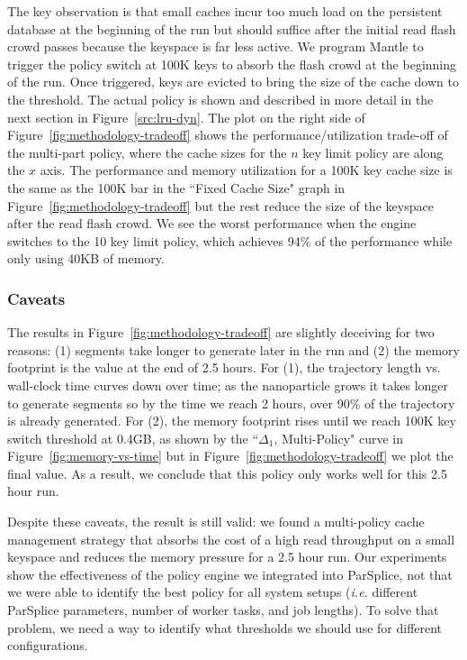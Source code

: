 The key observation is that small caches incur too much load on the persistent
database at the beginning of the run but should suffice after the initial read
flash crowd passes because the keyspace is far less active.  We program Mantle
to trigger the policy switch at 100K keys to absorb the flash crowd at the
beginning of the run. Once triggered, keys are evicted to bring the size of the
cache down to the threshold.  The actual policy is shown and described in more
detail in the next section in Figure~\ref{src:lru-dyn}.  The plot on the right
side of Figure~\ref{fig:methodology-tradeoff} shows the performance/utilization
trade-off of the multi-part policy, where the cache sizes for the \(n\) key
limit policy are along the \(x\) axis.  The performance and memory utilization
for a 100K key cache size is the same as the 100K bar in the ``Fixed Cache
Size" graph in Figure~\ref{fig:methodology-tradeoff} but the rest reduce the
size of the keyspace after the read flash crowd.  We see the worst performance
when the engine switches to the 10 key limit policy, which achieves 94\% of the
performance while only using 40KB of memory. 

\subsubsection*{Caveats}

The results in Figure~\ref{fig:methodology-tradeoff} are slightly deceiving for
two reasons: (1) segments take longer to generate later in the run and (2) the
memory footprint is the value at the end of 2.5 hours.  For (1), the trajectory
length vs.  wall-clock time curves down over time; as the nanoparticle grows it
takes longer to generate segments so by the time we reach 2 hours, over 90\% of
the trajectory is already generated.  For (2), the memory footprint rises until
we reach 100K key switch threshold at 0.4GB, as shown by the ``\(\Delta_1\),
Multi-Policy" curve in Figure~\ref{fig:memory-vs-time} but in
Figure~\ref{fig:methodology-tradeoff} we plot the final value. As a result, we
conclude that this policy only works well for this 2.5 hour run.

Despite these caveats, the result is still valid: we found a multi-policy cache 
management strategy that absorbs the cost of a high read throughput on a small
keyspace and reduces the memory pressure for a 2.5 hour run. Our experiments
show the effectiveness of the policy engine we integrated into
ParSplice, not that we were able to identify the best policy for all system
setups ({\it i.e.} different ParSplice parameters, number of worker tasks, and
job lengths).  To solve that problem, we need a way to identify what thresholds
we should use for different configurations.

